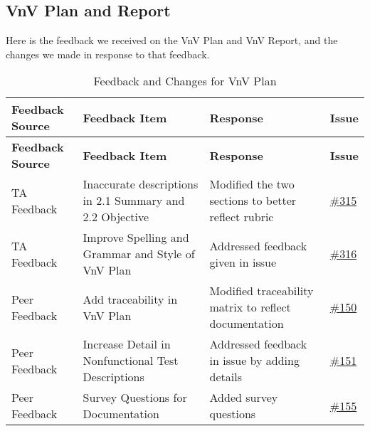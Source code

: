 \documentclass{article}
\begin{document}
\subsection{VnV Plan and Report}

Here is the feedback we received on the VnV Plan and VnV Report, and the changes we made in response to that feedback.
\begin{longtable}{| p{} | p{} | p{} | p{} |}
    \caption{Feedback and Changes for VnV Plan} \\
    \hline
    \textbf{Feedback Source} & \textbf{Feedback Item} & \textbf{Response} & \textbf{Issue} \\
    \hline
    \endfirsthead
    \hline
    \textbf{Feedback Source} & \textbf{Feedback Item} & \textbf{Response} & \textbf{Issue} \\
    \hline
    \endhead
    \hline
    \endfoot
    TA Feedback & Inaccurate descriptions in 2.1 Summary and 2.2 Objective  & Modified the two sections to better reflect rubric & \href{https://github.com/TPGEngine/tpg/issues/315}{\#315} \\
    \hline
    TA Feedback & Improve Spelling and Grammar and Style of VnV Plan  & Addressed feedback given in issue & \href{https://github.com/TPGEngine/tpg/issues/316}{\#316} \\
    \hline
    Peer Feedback & Add traceability in VnV Plan & Modified traceability matrix to reflect documentation & \href{https://github.com/TPGEngine/tpg/issues/150}{\#150} \\
    \hline
    Peer Feedback & Increase Detail in Nonfunctional Test Descriptions & Addressed feedback in issue by adding details & \href{https://github.com/TPGEngine/tpg/issues/151}{\#151} \\
    \hline
     Peer Feedback & Survey Questions for Documentation & Added survey questions & \href{https://github.com/TPGEngine/tpg/issues/155}{\#155} \\
    \hline


\end{longtable}
\end{document}
